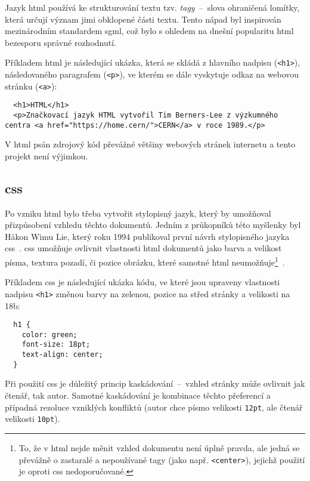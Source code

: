 \documentclass[a4paper, 12pt]{article}
\begin{document}
  Jazyk \gls{html} používá ke strukturování textu tzv. \emph{tagy}~--~slova ohraničená lomítky, která určují význam jimi obklopené části textu. Tento nápad byl inspirován mezinárodním standardem \gls{sgml}, což bylo s ohledem na dnešní popularitu \gls{html} bezesporu správné rozhodnutí.

  Příkladem \gls{html} je následující ukázka, která se skládá z hlavního nadpisu (\texttt{<h1>}), následovaného paragrafem (\texttt{<p>}), ve kterém se dále vyskytuje odkaz na webovou stránku (\texttt{<a>}):

  \begin{verbatim}
  <h1>HTML</h1>
  <p>Značkovací jazyk HTML vytvořil Tim Berners-Lee z výzkumného centra <a href="https://home.cern/">CERN</a> v roce 1989.</p>
  \end{verbatim}

  V \gls{html} psán zdrojový kód převážné většiny webových stránek internetu a tento projekt není výjimkou.


  \subsection{\acrshort{css}} \label{sec:CSS}
  Po vzniku \gls{html} bylo třeba vytvořit stylopisný jazyk, který by umožňoval přizpůsobení vzhledu těchto dokumentů. Jedním z průkopníků této myšlenky byl Håkon Wimu Lie, který roku 1994 publikoval první návrh stylopisného jazyka \gls{css}~\cite{css-proposal}. \gls{css} umožňuje ovlivnit vlastnosti \gls{html} dokumentů jako barva a velikost písma, textura pozadí, či pozice obrázku, které samotné \gls{html} neumožňuje\footnote{To, že v \gls{html} nejde měnit vzhled dokumentu není úplně pravda, ale jedná se převážně o zastaralé a nepoužívané tagy (jako např. \texttt{<center>}), jejichž použití je oproti \gls{css} nedoporučované.}~\cite{css-saga}.

  Příkladem \gls{css} je následující ukázka kódu, ve které jsou upraveny vlastnosti nadpisu \texttt{<h1>} změnou barvy na zelenou, pozice na střed stránky a velikosti na 18b:

  \begin{verbatim}
  h1 {
    color: green;
    font-size: 18pt;
    text-align: center;
  }
  \end{verbatim}

  Při použití \gls{css} je důležitý princip kaskádování~--~vzhled stránky může ovlivnit jak čtenář, tak autor. Samotné kaskádování je kombinace těchto přeferencí a případná rezoluce vzniklých konfliktů (autor chce písmo velikosti \texttt{12pt}, ale čtenář velikosti \texttt{10pt}).
\end{document}
